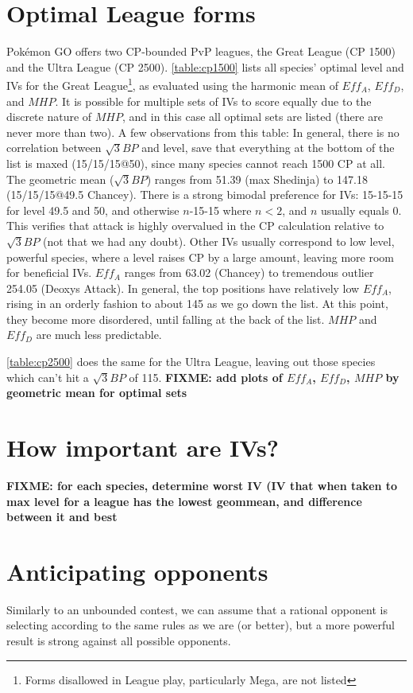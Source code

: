 \section{Optimal League forms}
Pokémon GO offers two CP-bounded PvP leagues, the Great League (CP 1500) and
   the Ultra League (CP 2500).
\autoref{table:cp1500} lists all species' optimal level and IVs for the Great League\footnote{Forms
  disallowed in League play, particularly Mega, are not listed},
  as evaluated using the harmonic mean of $Eff_A$, $Eff_D$, and $MHP$.
It is possible for multiple sets of IVs to score equally due to the discrete nature
  of $MHP$, and in this case all optimal sets are listed (there are never more than
  two).
A few observations from this table:
In general, there is no correlation between $\sqrt{3}{BP}$ and level,
  save that everything at the bottom of the list is maxed (15/15/15@50),
  since many species cannot reach 1500 CP at all.
The geometric mean ($\sqrt{3}{BP}$) ranges from 51.39 (max Shedinja)
  to 147.18 (15/15/15@49.5 Chancey).
There is a strong bimodal preference for IVs: 15-15-15 for level 49.5
  and 50, and otherwise $n$-15-15 where $n < 2$, and $n$ usually equals 0.
This verifies that attack is highly overvalued in the CP calculation
  relative to $\sqrt{3}{BP}$ (not that we had any doubt).
Other IVs usually correspond to low level, powerful species, where a level
  raises CP by a large amount, leaving more room for beneficial IVs.
$Eff_A$ ranges from 63.02 (Chancey) to tremendous outlier 254.05 (Deoxys Attack).
In general, the top positions have relatively low $Eff_A$, rising in an
  orderly fashion to about 145 as we go down the list.
At this point, they become more disordered, until falling at the back
  of the list.
$MHP$ and $Eff_D$ are much less predictable.

\autoref{table:cp2500} does the same for the Ultra League, leaving out those species which
  can't hit a $\sqrt{3}{BP}$ of 115.
\textbf{FIXME: add plots of $Eff_A$, $Eff_D$, $MHP$ by geometric mean for optimal sets}


\section{How important are IVs?}
\textbf{FIXME: for each species, determine worst IV (IV that when taken to max level for a league has the lowest geommean, and difference between it and best}

\section{Anticipating opponents}
Similarly to an unbounded contest, we can assume that a rational opponent is selecting
  according to the same rules as we are (or better), but a more powerful result is
  strong against all possible opponents.

